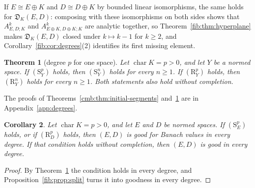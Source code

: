 \documentclass[11pt]{amsart}
\newtheorem{theorem}{Theorem}[section]
\newtheorem{corollary}[theorem]{Corollary}
\theoremstyle{definition}
\theoremstyle{remark}
\numberwithin{equation}{section}
\theoremstyle{plain}
\theoremstyle{definition}
\theoremstyle{plain}
\newcommand{\fD}{\mathfrak D}
\begin{document}
If $E\cong E\oplus K$ and $D\cong D\oplus K$ by bounded linear isomorphisms, the same holds for $\fD_K(E,D)$: composing with
these isomorphisms on both sides shows that $A^k_{E,D;K}$ and $A^k_{E\oplus K,D\oplus K;K}$ are analytic together, so
Theorem~\ref{fib:thm:hyperplane} makes $\fD_K(E,D)$ closed under $k\mapsto k-1$ for $k\ge2$, and
Corollary~\ref{fib:cor:degrees}(2) identifies its first missing element.

\begin{theorem}[degree $p$ for one space]\label{cmb:thm:column}
Let $\operatorname{char}K=p>0$, and let $Y$ be a normed space. If $(\mathrm S^p_Y)$ holds, then $(\mathrm S^n_Y)$ holds for
every $n\ge1$. If $(\mathrm R^p_Y)$ holds, then $(\mathrm R^n_Y)$ holds for every $n\ge1$. Both statements also hold
without completion.
\end{theorem}

The proofs of Theorems~\ref{cmb:thm:initial-segments} and~\ref{cmb:thm:column} are in Appendix~\ref{app:degrees}.

\begin{corollary}\label{cmb:cor:column}
Let $\operatorname{char}K=p>0$, and let $E$ and $D$ be normed spaces. If $(\mathrm S^p_E)$ holds, or if
$(\mathrm R^p_D)$ holds, then $(E,D)$ is good for Banach values in every degree. If that condition holds without
completion, then $(E,D)$ is good in every degree.
\end{corollary}

\begin{proof}
By Theorem~\ref{cmb:thm:column} the condition holds in every degree, and Proposition~\ref{fib:prop:split} turns it into
goodness in every degree.
\end{proof}
\end{document}

